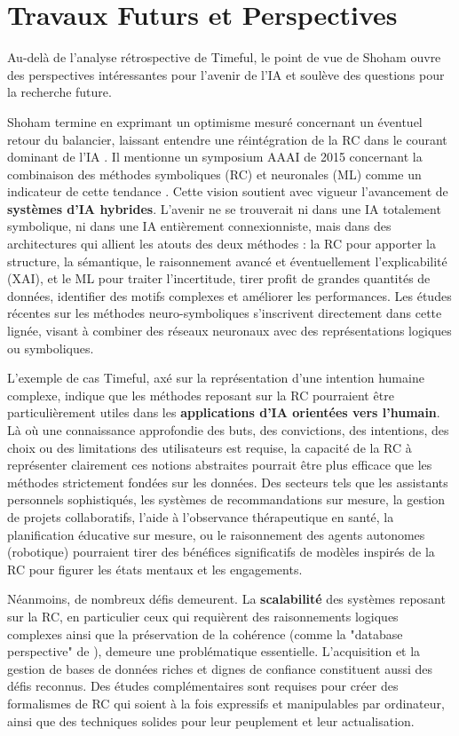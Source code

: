 \documentclass[11pt,a4paper]{article}
\begin{document}
\section{Travaux Futurs et Perspectives}
\label{sec:futur}
Au-delà de l'analyse rétrospective de Timeful, le point de vue de Shoham \citep{Shoham2015Why} ouvre des perspectives intéressantes pour l'avenir de l'IA et soulève des questions pour la recherche future.

Shoham termine en exprimant un optimisme mesuré concernant un éventuel retour du balancier, laissant entendre une réintégration de la RC dans le courant dominant de l'IA \citep{Shoham2015Why}. Il mentionne un symposium AAAI de 2015 concernant la combinaison des méthodes symboliques (RC) et neuronales (ML) comme un indicateur de cette tendance \citep{2002Aaai}. Cette vision soutient avec vigueur l'avancement de \textbf{systèmes d'IA hybrides}. L'avenir ne se trouverait ni dans une IA totalement symbolique, ni dans une IA entièrement connexionniste, mais dans des architectures qui allient les atouts des deux méthodes : la RC pour apporter la structure, la sémantique, le raisonnement avancé et éventuellement l'explicabilité (XAI), et le ML pour traiter l'incertitude, tirer profit de grandes quantités de données, identifier des motifs complexes et améliorer les performances. Les études récentes sur les méthodes neuro-symboliques s'inscrivent directement dans cette lignée, visant à combiner des réseaux neuronaux avec des représentations logiques ou symboliques. 

L'exemple de cas Timeful, axé sur la représentation d'une intention humaine complexe, indique que les méthodes reposant sur la RC pourraient être particulièrement utiles dans les \textbf{applications d'IA orientées vers l'humain}. Là où une connaissance approfondie des buts, des convictions, des intentions, des choix ou des limitations des utilisateurs est requise, la capacité de la RC à représenter clairement ces notions abstraites pourrait être plus efficace que les méthodes strictement fondées sur les données. Des secteurs tels que les assistants personnels sophistiqués, les systèmes de recommandations sur mesure, la gestion de projets collaboratifs, l'aide à l'observance thérapeutique en santé, la planification éducative sur mesure, ou le raisonnement des agents autonomes (robotique) pourraient tirer des bénéfices significatifs de modèles inspirés de la RC pour figurer les états mentaux et les engagements. 


Néanmoins, de nombreux défis demeurent. La \textbf{scalabilité} des systèmes reposant sur la RC, en particulier ceux qui requièrent des raisonnements logiques complexes ainsi que la préservation de la cohérence (comme la "database perspective" de \citet{Shoham2009Logics}), demeure une problématique essentielle. L'acquisition et la gestion de bases de données riches et dignes de confiance constituent aussi des défis reconnus. Des études complémentaires sont requises pour créer des formalismes de RC qui soient à la fois expressifs et manipulables par ordinateur, ainsi que des techniques solides pour leur peuplement et leur actualisation. 
\end{document}
